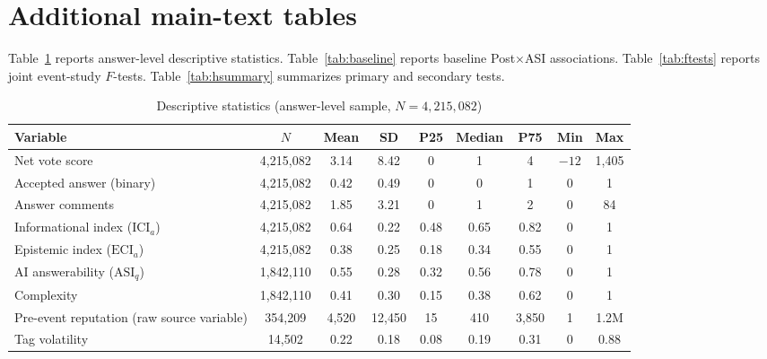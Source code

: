 \section{Additional main-text tables}
\label{app:main_tables}

Table~\ref{tab:descriptives} reports answer-level descriptive statistics.
Table~\ref{tab:baseline} reports baseline Post$\times$ASI associations.
Table~\ref{tab:ftests} reports joint event-study $F$-tests.
Table~\ref{tab:hsummary} summarizes primary and secondary tests.

\begin{table}[t]
\centering
\caption{Descriptive statistics (answer-level sample, $N = 4{,}215{,}082$)}
\label{tab:descriptives}
\scriptsize
\setlength{\tabcolsep}{2pt}
\begin{tabular}{lcccccccc}
\toprule
Variable & $N$ & Mean & SD & P25 & Median & P75 & Min & Max \\
\midrule
Net vote score & 4,215,082 & 3.14 & 8.42 & 0 & 1 & 4 & $-12$ & 1,405 \\
Accepted answer (binary) & 4,215,082 & 0.42 & 0.49 & 0 & 0 & 1 & 0 & 1 \\
Answer comments & 4,215,082 & 1.85 & 3.21 & 0 & 1 & 2 & 0 & 84 \\
Informational index ($\mathrm{ICI}_a$) & 4,215,082 & 0.64 & 0.22 & 0.48 & 0.65 & 0.82 & 0 & 1 \\
Epistemic index ($\mathrm{ECI}_a$) & 4,215,082 & 0.38 & 0.25 & 0.18 & 0.34 & 0.55 & 0 & 1 \\
AI answerability ($\mathrm{ASI}_q$) & 1,842,110 & 0.55 & 0.28 & 0.32 & 0.56 & 0.78 & 0 & 1 \\
Complexity & 1,842,110 & 0.41 & 0.30 & 0.15 & 0.38 & 0.62 & 0 & 1 \\
Pre-event reputation (raw source variable) & 354,209 & 4,520 & 12,450 & 15 & 410 & 3,850 & 1 & 1.2M \\
Tag volatility & 14,502 & 0.22 & 0.18 & 0.08 & 0.19 & 0.31 & 0 & 0.88 \\
\bottomrule
\end{tabular}
\end{table}

